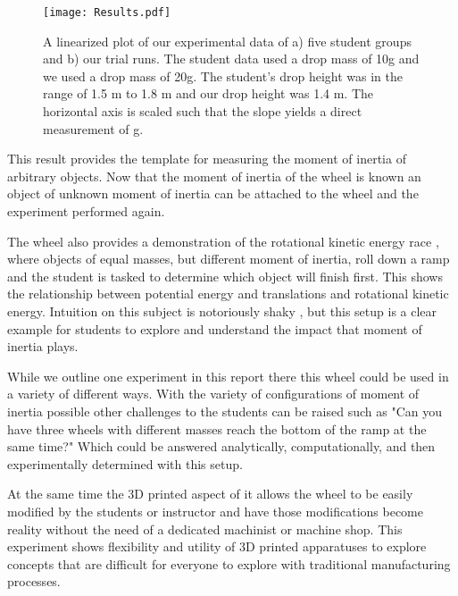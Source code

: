 \documentclass[prb,preprint]{revtex4-1}
\begin{document}
\begin{figure}[tph]
\begin{centering}
  \texttt{[image: Results.pdf]}
     \caption{A linearized plot of our experimental data of a) five student groups and b) our trial runs. The student data used a drop mass of 10g and we used a drop mass of 20g.  The student's drop height was in the range of 1.5 m to 1.8 m and our drop height was 1.4 m.  The horizontal axis is scaled such that the slope yields a direct measurement of g. }
     \end{centering}
     \label{fit_figure}
\end{figure}



This result provides the template for measuring the moment of inertia of arbitrary objects.  Now that the moment of inertia of the wheel is known an object of unknown moment of inertia can be attached to the wheel and the experiment performed again. 

The wheel also provides a demonstration of the rotational kinetic energy race \cite{RollingSphere}, where objects of equal masses, but different moment of inertia, roll down a ramp and the student is tasked to determine which object will finish first.  This shows the relationship between potential energy and translations and rotational kinetic energy.  Intuition on this subject is notoriously shaky \cite{StudentUnderstanding} , but this setup is a clear example for students to explore and understand the impact that moment of inertia plays.  

	While we outline one experiment in this report there this wheel could be used in a variety of different ways. With the variety of configurations of moment of inertia possible other challenges to the students can be raised such as "Can you have three wheels with different masses reach the bottom of the ramp at the same time?" Which could be answered analytically, computationally, and then experimentally determined with this setup. 
	
	  At the same time the 3D printed aspect of it allows the wheel to be easily modified by the students or instructor and have those modifications become reality without the need of a dedicated machinist or machine shop.  This experiment shows flexibility and utility of 3D printed apparatuses to explore concepts that are difficult for everyone to explore with traditional manufacturing processes. 	 


	
\end{document}
